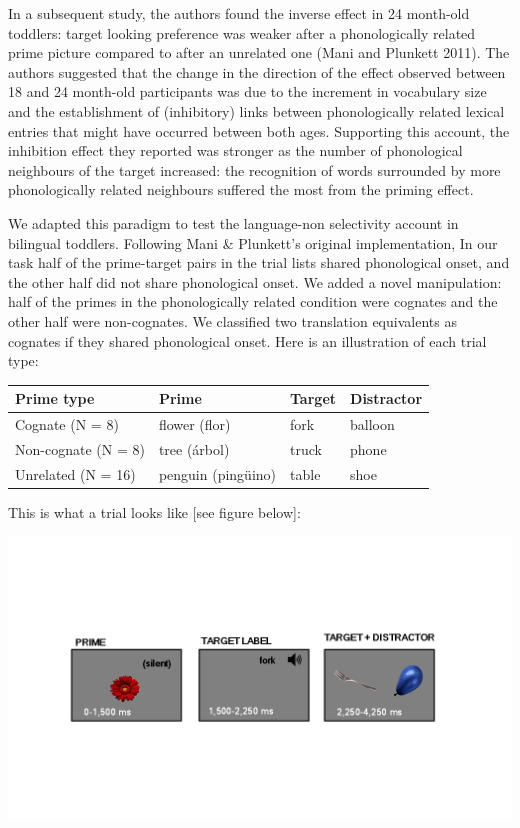 \documentclass[
]{article}
\begin{document}
In a subsequent study, the authors found the inverse effect in 24
month-old toddlers: target looking preference was weaker after a
phonologically related prime picture compared to after an unrelated one
(Mani and Plunkett 2011). The authors suggested that the change in the
direction of the effect observed between 18 and 24 month-old
participants was due to the increment in vocabulary size and the
establishment of (inhibitory) links between phonologically related
lexical entries that might have occurred between both ages. Supporting
this account, the inhibition effect they reported was stronger as the
number of phonological neighbours of the target increased: the
recognition of words surrounded by more phonologically related
neighbours suffered the most from the priming effect.

We adapted this paradigm to test the language-non selectivity account in
bilingual toddlers. Following Mani \& Plunkett's original
implementation, In our task half of the prime-target pairs in the trial
lists shared phonological onset, and the other half did not share
phonological onset. We added a novel manipulation: half of the primes in
the phonologically related condition were cognates and the other half
were non-cognates. We classified two translation equivalents as cognates
if they shared phonological onset. Here is an illustration of each trial
type:

\captionsetup[table]{labelformat=empty,skip=1pt}
\begin{longtable}{llll}
\toprule
Prime type & Prime & Target & Distractor \\ 
\midrule
Cognate (N = 8) & flower (flor) & fork & balloon \\ 
Non-cognate (N = 8) & tree (árbol) & truck & phone \\ 
Unrelated (N = 16) & penguin (pingüino) & table & shoe \\ 
\bottomrule
\end{longtable}

This is what a trial looks like {[}see figure below{]}:

\includegraphics{img/task.png}
\end{document}
